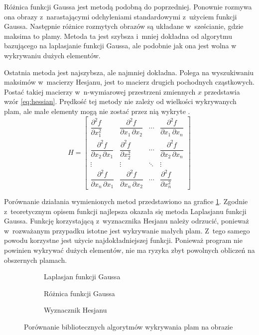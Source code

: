 Różnica funkcji Gaussa jest metodą podobną do poprzedniej.
Ponownie rozmywa ona obrazy z~narastającymi odchyleniami standardowymi
z~użyciem funkcji Gaussa.
Następnie różnice rozmytych obrazów są układane w~sześcianie, gdzie
maksima to plamy.
Metoda ta jest szybsza i~mniej dokładna od algorytmu bazującego na laplasjanie
funkcji Gaussa, ale podobnie jak ona jest wolna w wykrywaniu dużych elementów.

Ostatnia metoda jest najszybsza, ale najmniej dokładna.
Polega na wyszukiwaniu maksimów w~macierzy Hesjanu, jest to macierz
drugich pochodnych cząstkowych.
Postać takiej macierzy w~n-wymiarowej przestrzeni zmiennych $ x $ przedstawia
wzór \ref{eq:hessian}.
Prędkość tej metody nie zależy od wielkości wykrywanych plam, ale małe
elementy mogą nie zostać przez nią wykryte \cite{scikit_reference}.
\begin{equation}
	H = \begin{bmatrix}
		\dfrac{\partial^2 f}{\partial x_1^2} &
		\dfrac{\partial^2 f}{\partial x_1\,\partial x_2} &
		\cdots & \dfrac{\partial^2 f}{\partial x_1\,\partial x_n} \\[2.2ex]
		\dfrac{\partial^2 f}{\partial x_2\,\partial x_1} &
		\dfrac{\partial^2 f}{\partial x_2^2} &
		\cdots & \dfrac{\partial^2 f}{\partial x_2\,\partial x_n} \\[2.2ex]
		\vdots & \vdots & \ddots & \vdots \\[2.2ex]
		\dfrac{\partial^2 f}{\partial x_n\,\partial x_1} &
		\dfrac{\partial^2 f}{\partial x_n\,\partial x_2} &
		\cdots &
		\dfrac{\partial^2 f}{\partial x_n^2}
	\end{bmatrix}
	\label{eq:hessian}
\end{equation}

Porównanie działania wymienionych metod przedstawiono na grafice
\ref{fig:blob_compare}.
Zgodnie z~teoretycznym opisem funkcji najlepsza okazała się metoda
Laplasjanu funkcji Gaussa.
Funkcję korzystającą z~wyznacznika Hesjanu należy odrzucić, ponieważ
w~rozważanym przypadku istotne jest wykrywanie małych plam.
Z~tego samego powodu korzystne jest użycie najdokładniejszej funkcji.
Ponieważ program nie powinien wykrywać dużych elementów, nie ma ryzyka zbyt
powolnych obliczeń na obszernych plamach.
\begin{figure}[htb]
	\centering
	\begin{subfigure}[t]{0.3\textwidth}
		\centering
		
		\caption{Laplasjan funkcji Gaussa}
	\end{subfigure}
	\hfill
	\begin{subfigure}[t]{0.3\textwidth}
		\centering
		
		\caption{Różnica funkcji Gaussa}
	\end{subfigure}
	\hfill
	\begin{subfigure}[t]{0.3\textwidth}
		\centering
		
		\caption{Wyznacznik Hesjanu}
	\end{subfigure}
	\caption{Porównanie bibliotecznych algorytmów wykrywania plam na obrazie}
	\label{fig:blob_compare}
\end{figure}

